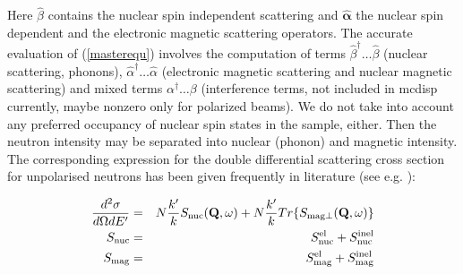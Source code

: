 Here $\hat \beta$ contains the nuclear spin independent scattering and $\hat {\bm \alpha}$ the nuclear spin dependent
and the electronic magnetic scattering operators.
The accurate evaluation of (\ref{masterequ}) involves the computation of terms $\hat \beta^{\dagger} \dots \hat \beta$ (nuclear scattering, phonons),
$\hat \alpha^{\dagger} \dots \hat \alpha$ (electronic magnetic scattering and nuclear magnetic scattering) 
and mixed terms $\alpha^{\dagger} \dots \beta$ (interference terms, not included in mcdisp currently, maybe nonzero only for
polarized beams).  We do not take into account any preferred occupancy of nuclear spin states in the sample, either.
Then the neutron intensity may be separated into nuclear (phonon) and magnetic intensity.
The corresponding expression for the double differential scattering cross section 
for unpolarised neutrons has been given frequently in literature (see e.g. \cite{lovesey84-1}):



\begin{eqnarray}\label{dsdoderepeated}
\frac{d^2\sigma}{d\Omega dE'}&=&
N\frac{k'}{k}S_{\rm nuc}(\mathbf Q,\omega) +
N\frac{k'}{k} 
Tr\{S_{\rm mag\perp}(\mathbf Q,\omega)\} \nonumber \\
S_{\rm nuc}&=&S_{\rm nuc}^{\rm el}+S_{\rm nuc}^{\rm inel} \label{snuc} \\ 
S_{\rm mag}&=&S_{\rm mag}^{\rm el}+S_{\rm mag}^{\rm inel} \label{smag} 
\end{eqnarray}


